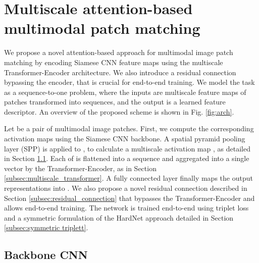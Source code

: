 \documentclass[10pt,journal]{IEEEtran}\usepackage{amsfonts}
\begin{document}
\section{Multiscale attention-based multimodal patch matching}

We propose a novel attention-based approach for multimodal image patch
matching by encoding Siamese CNN feature maps using the multiscale
Transformer-Encoder architecture. We also introduce a residual connection
bypassing the encoder, that is crucial for end-to-end training. We model the
task as a sequence-to-one problem, where the inputs are multiscale feature
maps of patches transformed into sequences, and the output is a learned
feature descriptor. An overview of the proposed scheme is shown in Fig. \ref {fig:arch}.

Let  be a pair of multimodal image patches. First, we
compute the corresponding activation maps  using the Siamese CNN backbone. A spatial pyramid pooling layer (SPP)
\cite{SPP} is applied to ,
to calculate a multiscale activation map ,  as detailed in Section \ref {subsec:backbone}. Each of  is flattened into a sequence and aggregated into a single vector
by the Transformer-Encoder, as in Section \ref{subsec:multiscale_transformer}. A fully connected layer finally maps the output representations into . We also propose a novel residual connection described in Section \ref{subsec:residual_connection} that bypasses the Transformer-Encoder and
allows end-to-end training. The network is trained end-to-end using triplet
loss \cite{FaceNetTripletLoss} and a symmetric formulation of the HardNet
approach \cite{HardNet} detailed in Section \ref{subsec:symmetric triplett}.

\subsection{Backbone CNN}

\label{subsec:backbone}
\end{document}
